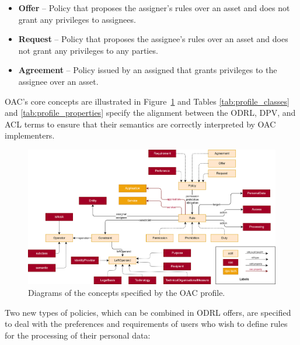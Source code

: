 \begin{itemize}
    \item \textbf{Offer} -- Policy that proposes the assigner's rules over an asset and does not grant any privileges to assignees.
    \item \textbf{Request} -- Policy that proposes the assignee's rules over an asset and does not grant any privileges to any parties.
    \item \textbf{Agreement} -- Policy issued by an assigned that grants privileges to the assignee over an asset.
\end{itemize}

OAC's core concepts are illustrated in Figure~\ref{fig:oac_diagram} and Tables \ref{tab:profile_classes} and \ref{tab:profile_properties} specify the alignment between the ODRL, DPV, and ACL terms to ensure that their semantics are correctly interpreted by OAC implementers.


\begin{figure}[htbp]
    \centering
    \includegraphics[width=\linewidth]{figures/chapter-4/oac_diagram.png}
    \caption{Diagrams of the concepts specified by the OAC profile.}
    \label{fig:oac_diagram}
\end{figure}

Two new types of policies, which can be combined in ODRL offers, are specified to deal with the preferences and requirements of users who wish to define rules for the processing of their personal data:


